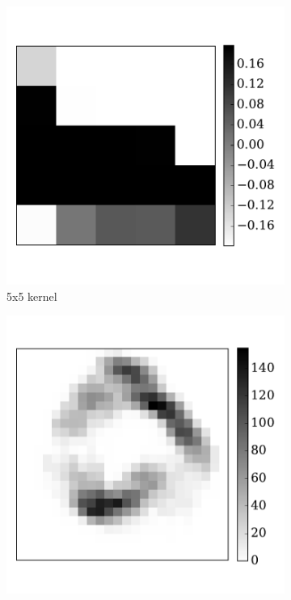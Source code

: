 \begin{figure}[tbh!]
\begin{subfigure}[t]{0.3\textwidth}
			\includegraphics[width=\textwidth]{pics_iconip/6-3.pdf}
			\caption{5x5 kernel}
			\label{Fig:63}
		\end{subfigure}
		\begin{subfigure}[t]{0.3\textwidth}
			\includegraphics[width=\textwidth]{pics_iconip/6-4.pdf}

\end{subfigure}
\end{figure}
